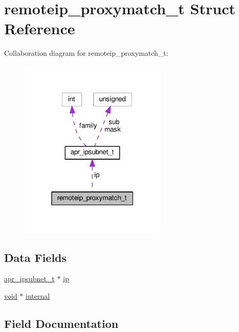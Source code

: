 \hypertarget{structremoteip__proxymatch__t}{}\section{remoteip\+\_\+proxymatch\+\_\+t Struct Reference}
\label{structremoteip__proxymatch__t}


Collaboration diagram for remoteip\+\_\+proxymatch\+\_\+t\+:
\nopagebreak
\begin{figure}[H]
\begin{center}
\leavevmode
\includegraphics[width=199pt]{structremoteip__proxymatch__t__coll__graph}
\end{center}
\end{figure}
\subsection*{Data Fields}
\begin{DoxyCompactItemize}
\item 
\hyperlink{structapr__ipsubnet__t}{apr\+\_\+ipsubnet\+\_\+t} $\ast$ \hyperlink{structremoteip__proxymatch__t_aad4a9195988bd9d441d30eb9b47847d0}{ip}
\item 
\hyperlink{group__MOD__ISAPI_gacd6cdbf73df3d9eed42fa493d9b621a6}{void} $\ast$ \hyperlink{structremoteip__proxymatch__t_a62cfdc644d931e99e77819e3cff26094}{internal}
\end{DoxyCompactItemize}


\subsection{Field Documentation}
